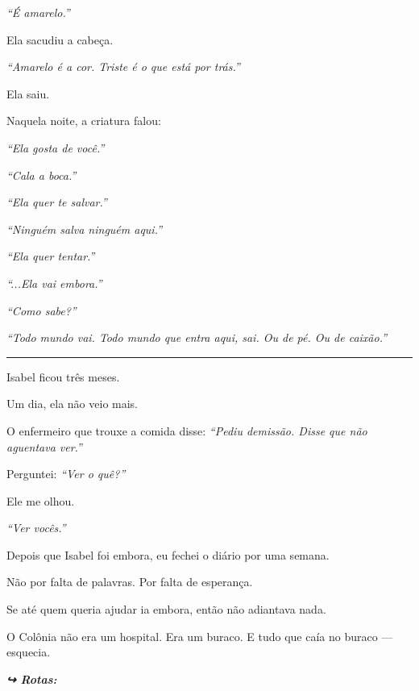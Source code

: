 \noindent \textit{\textquotedblleft{}É amarelo.\textquotedblright{}}

\noindent Ela sacudiu a cabeça.

\noindent \textit{\textquotedblleft{}Amarelo é a cor. Triste é o que está por trás.\textquotedblright{}}

\noindent Ela saiu.

\noindent Naquela noite, a criatura falou:

\noindent \textit{\textquotedblleft{}Ela gosta de você.\textquotedblright{}}

\noindent \textit{\textquotedblleft{}Cala a boca.\textquotedblright{}}

\noindent \textit{\textquotedblleft{}Ela quer te salvar.\textquotedblright{}}

\noindent \textit{\textquotedblleft{}Ninguém salva ninguém aqui.\textquotedblright{}}

\noindent \textit{\textquotedblleft{}Ela quer tentar.\textquotedblright{}}

\noindent \textit{\textquotedblleft{}...Ela vai embora.\textquotedblright{}}

\noindent \textit{\textquotedblleft{}Como sabe?\textquotedblright{}}

\noindent \textit{\textquotedblleft{}Todo mundo vai. Todo mundo que entra aqui, sai. Ou de pé. Ou de caixão.\textquotedblright{}}

\vspace{0.5em}\noindent\rule{\textwidth}{0.5pt}\vspace{0.5em}

\noindent Isabel ficou três meses.

\noindent Um dia, ela não veio mais.

\noindent O enfermeiro que trouxe a comida disse: \textit{\textquotedblleft{}Pediu demissão. Disse que não aguentava ver.\textquotedblright{}}

\noindent Perguntei: \textit{\textquotedblleft{}Ver o quê?\textquotedblright{}}

\noindent Ele me olhou.

\noindent \textit{\textquotedblleft{}Ver vocês.\textquotedblright{}}

\noindent Depois que Isabel foi embora, eu fechei o diário por uma semana.

\noindent Não por falta de palavras.
Por falta de esperança.

\noindent Se até quem queria ajudar ia embora, então não adiantava nada.

\noindent O Colônia não era um hospital.
Era um buraco.
E tudo que caía no buraco --- esquecia.

\vspace{0.5em}
\noindent\textit{\textbf{↪ Rotas:}  \rotasep {}}